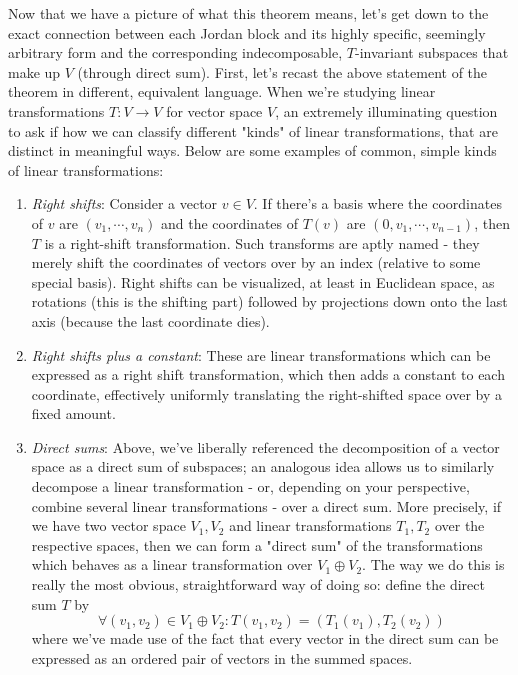 \documentclass{article}
\newcommand{\nn}{\leavevmode \newline \newline}
\begin{document}
\nn
Now that we have a picture of what this theorem means, let's get down to the exact connection between each Jordan block and its highly specific, seemingly arbitrary form and the corresponding indecomposable, $ T $-invariant subspaces that make up $ V $ (through direct sum). First, let's recast the above statement of the theorem in different, equivalent language. When we're studying linear transformations $ T: V \rightarrow V $ for vector space $ V $, an extremely illuminating question to ask if how we can classify different "kinds" of linear transformations, that are distinct in meaningful ways. Below are some examples of common, simple kinds of linear transformations:

\begin{enumerate}
	\item \textit{Right shifts}: Consider a vector $ v \in V $. If there's a basis where the coordinates of $ v $ are $ (v_1, \cdots, v_n) $ and the coordinates of $ T(v) $ are $ (0, v_1, \cdots, v_{n - 1}) $, then $ T $ is a right-shift transformation. Such transforms are aptly named - they merely shift the coordinates of vectors over by an index (relative to some special basis). Right shifts can be visualized, at least in Euclidean space, as rotations (this is the shifting part) followed by projections down onto the last axis (because the last coordinate dies).
	\item \textit{Right shifts plus a constant}: These are linear transformations which can be expressed as a right shift transformation, which then adds a constant to each coordinate, effectively uniformly translating the right-shifted space over by a fixed amount.
	\item \textit{Direct sums}: Above, we've liberally referenced the decomposition of a vector space as a direct sum of subspaces; an analogous idea allows us to similarly decompose a linear transformation - or, depending on your perspective, combine several linear transformations - over a direct sum. More precisely, if we have two vector space $ V_1, V_2 $ and linear transformations $ T_1, T_2 $ over the respective spaces, then we can form a "direct sum" of the transformations which behaves as a linear transformation over $ V_1 \oplus V_2 $. The way we do this is really the most obvious, straightforward way of doing so: define the direct sum $ T $ by
		$$ \forall (v_1, v_2) \in V_1 \oplus V_2: T(v_1, v_2) = (T_1(v_1), T_2(v_2)) $$
	where we've made use of the fact that every vector in the direct sum can be expressed as an ordered pair of vectors in the summed spaces.
\end{enumerate}
\end{document}
